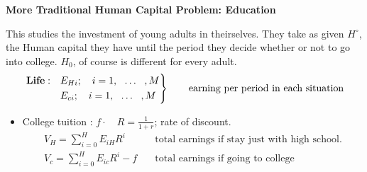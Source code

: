 \documentclass[14pt,notitlepage]{article}
\begin{document}
\textbf{More Traditional Human Capital Problem: Education}

This studies the investment of young adults in theirselves. They take as given $H^{\circ}$, the Human capital they have until the period they decide whether or not to go into college. $H_0$, of course is different for every adult.
\begin{equation*}
\left.\begin{aligned}
        \textbf{Life}: \quad &E_{Hi} ; \quad i = 1, \ \ \ldots\ \ , M \\
        &E_{ci} ; \quad i = 1, \ \ \ldots\ \ , M
      \end{aligned}
\right\}
\qquad \text{earning per period in each situation} \\
\end{equation*}

\begin{itemize}
\item College tuition : $f \cdot \quad R = \frac{1}{1+r}$; rate of discount.
\begin{align*}
V_H = \sum \limits_{i=0}^{H} E_{iH} R^{i} \quad &\text{total earnings if stay just with high school}. \\
V_c = \sum \limits_{i=0}^{H} E_{ic} R^{i} - f \quad &\text{total earnings if going to college}
\end{align*}
\end{itemize}
\end{document}
